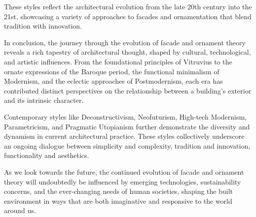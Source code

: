 These styles reflect the architectural evolution from the late 20th century into the 21st, showcasing a variety of approaches to facades and ornamentation that blend tradition with innovation.

In conclusion, the journey through the evolution of facade and ornament theory reveals a rich tapestry of architectural thought, shaped by cultural, technological, and artistic influences.
From the foundational principles of Vitruvius to the ornate expressions of the Baroque period, the functional minimalism of Modernism, and the eclectic approaches of Postmodernism, each era has contributed distinct perspectives on the relationship between a building's exterior and its intrinsic character.

Contemporary styles like Deconstructivism, Neofuturism, High-tech Modernism, Parametricism, and Pragmatic Utopianism further demonstrate the diversity and dynamism in current architectural practice.
These styles collectively underscore an ongoing dialogue between simplicity and complexity, tradition and innovation, functionality and aesthetics.

As we look towards the future, the continued evolution of facade and ornament theory will undoubtedly be influenced by emerging technologies, sustainability concerns, and the ever-changing needs of human societies, shaping the built environment in ways that are both imaginative and responsive to the world around us.


